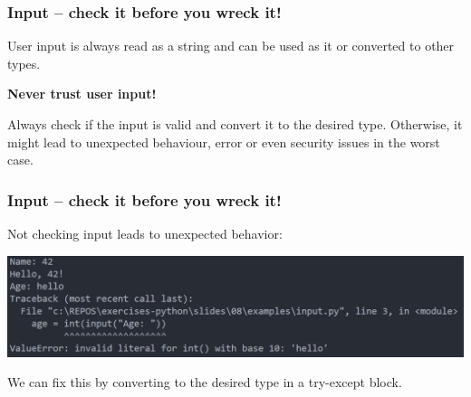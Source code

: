 \documentclass{beamer}
\begin{document}
\begin{frame}
  \frametitle{Input -- check it before you wreck it!}
  User input is always read as a string and can be used as it or converted to other types.\\
  \begin{center}
    \textbf{Never trust user input!}
  \end{center} 
  Always check if the input is valid and convert it to the desired type. Otherwise, it might lead to unexpected behaviour, error or even security issues in the worst case.\\
\end{frame}
\begin{frame}
  \frametitle{Input -- check it before you wreck it!}
  Not checking input leads to unexpected behavior: 
  \begin{center}
    \includegraphics[width=\textwidth]{examples/fig/wronginput.png}
  \end{center}
  We can fix this by converting to the desired type in a try-except block.\\
\end{frame}
\end{document}
